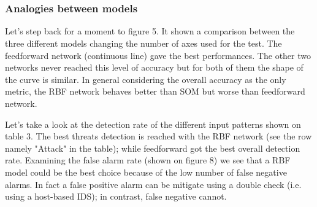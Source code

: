 \documentclass[twocolumn,11pt]{asme2ej}
\begin{document}
\smallskip\noindent
{}
\\\\


\subsubsection{Analogies between models}

Let's step back for a moment to figure 5. It shown a comparison between the three different models changing the number of axes used for the test. The feedforward network (continuous line) gave the best performances. The other two networks never reached this level of accuracy but for both of them the shape of the curve is similar. In general considering the overall accuracy as the only metric, the RBF network behaves better than SOM but worse than feedforward network.

Let's take a look at the detection rate of the different input patterns shown on table 3. The best threats detection is reached with the RBF network (see the row namely "Attack" in the table); while feedforward got the best overall detection rate. Examining the false alarm rate (shown on figure 8) we see that a RBF model could be the best choice because of the low number of false negative alarms. In fact a false positive alarm can be mitigate using a double check (i.e. using a host-based IDS); in contrast, false negative cannot.
\end{document}
